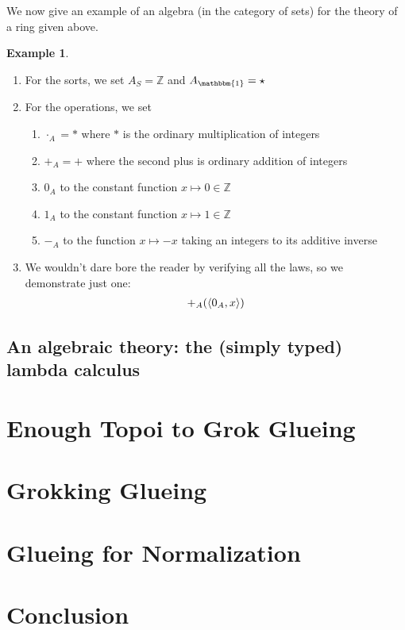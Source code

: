 \documentclass[12pt,twoside]{reedthesis}
\theoremstyle{definition}
\newtheorem{example}{Example}
\theoremstyle{remark}
\theoremstyle{theorem}
\begin{document}
We now give an example of an algebra (in the category of sets) for the theory of
a ring given above.
\begin{example}
  \begin{enumerate}
    \item For the sorts, we set $A_{S} = \mathbb{Z}$ and $A_{\mathbbm{1}} = {\star}$
    \item For the operations, we set
    \begin{enumerate}
      \item $\cdot_A = *$ where $*$ is the ordinary multiplication of integers
      \item $+_{A} = +$ where the second plus is ordinary addition of integers
      \item $0_{A}$ to the constant function $x \mapsto 0 \in \mathbb{Z}$
      \item $1_{A}$ to the constant function $x \mapsto 1 \in \mathbb{Z}$
      \item $-_{A}$ to the function $x \mapsto -x$ taking an integers to its additive inverse
    \end{enumerate}
    \item We wouldn't dare bore the reader by verifying all the laws, so we demonstrate just one:
    \begin{align*}
      +_{A}( \braket{0_{A}, x} )
    \end{align*}

  \end{enumerate}
\end{example}


\section{An algebraic theory: the (simply typed) lambda calculus}


\chapter{Enough Topoi to Grok Glueing}
\chapter{Grokking Glueing}
\chapter{Glueing for Normalization}

\chapter*{Conclusion}
\setcounter{chapter}{4}
\setcounter{section}{0}
\end{document}
